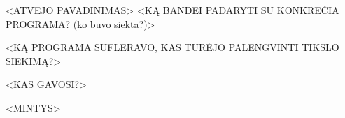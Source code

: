 \begin{xcase}{<ATVEJO PAVADINIMAS>}
  \xcgoal
  {
    <KĄ BANDEI PADARYTI SU KONKREČIA PROGRAMA? (ko buvo siekta?)>
  }
  
  \xctools
  {
    <KĄ PROGRAMA SUFLERAVO, KAS TURĖJO PALENGVINTI TIKSLO SIEKIMĄ?>
  }
  
  \xcresult
  {
    <KAS GAVOSI?>
  }
  
  \xcprinciples
  {
  }
  
  \xcthoughts
  {
    <MINTYS>
  }
\end{xcase}
